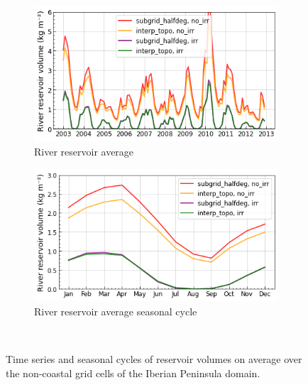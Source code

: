 \begin{figure}[htbp]
    \begin{subfigure}[b]{0.48\textwidth}
        \caption{River reservoir average}
        \includegraphics[width=\textwidth]{images/chap3/time_series/cont_streamr_time_series.png}
    \end{subfigure} 
    \begin{subfigure}[b]{0.48\textwidth}
        \caption{River reservoir average seasonal cycle}
        \includegraphics[width=\textwidth]{images/chap3/time_series/cont_streamr_seasonal_cycle.png}
    \end{subfigure} \\

    \caption{Time series and seasonal cycles of reservoir volumes on average over the non-coastal grid cells of the Iberian Peninsula domain.}
    \label{fig:reservoir_cont_time_series}
\end{figure}

